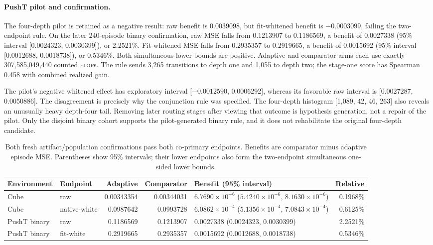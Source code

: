 \documentclass{article}
\newcommand{\flops}{\textsc{flop}s}
\begin{document}
\paragraph{PushT pilot and confirmation.}
The four-depth pilot is retained as a negative result: raw benefit is 0.0039098, but fit-whitened benefit is \(-0.0003099\), failing the two-endpoint rule. On the later 240-episode binary confirmation, raw MSE falls from 0.1213907 to 0.1186569, a benefit of 0.0027338 (95\% interval [0.0024323, 0.0030399]), or 2.2521\%. Fit-whitened MSE falls from 0.2935357 to 0.2919665, a benefit of 0.0015692 (95\% interval [0.0012688, 0.0018738]), or 0.5346\%. Both simultaneous lower bounds are positive. Adaptive and comparator arms each use exactly 307,585,049,440 counted \flops{}. The rule sends 3,265 transitions to depth one and 1,055 to depth two; the stage-one score has Spearman 0.458 with combined realized gain.

The pilot's negative whitened effect has exploratory interval [\(-0.0012590\), 0.0006292], whereas its favorable raw interval is [0.0027287, 0.0050886]. The disagreement is precisely why the conjunction rule was specified. The four-depth histogram [1,089, 42, 46, 263] also reveals an unusually heavy depth-four tail. Removing later routing stages after viewing that outcome is hypothesis generation, not a repair of the pilot. Only the disjoint binary cohort supports the pilot-generated binary rule, and it does not rehabilitate the original four-depth candidate.

\begin{table}[t]
\centering
\caption{Both fresh artifact/population confirmations pass both co-primary endpoints. Benefits are comparator minus adaptive episode MSE. Parentheses show 95\% intervals; their lower endpoints also form the two-endpoint simultaneous one-sided lower bounds.}
\label{tab:confirmations}
\scriptsize
\begin{tabularx}{\textwidth}{@{}l l r r Y r@{}}
\toprule
Environment & Endpoint & Adaptive & Comparator & Benefit (95\% interval) & Relative \\
\midrule
Cube & raw & 0.00343354 & 0.00344031 & \(6.7690{\times}10^{-6}\) (\(5.4240{\times}10^{-6}\), \(8.1630{\times}10^{-6}\)) & 0.1968\% \\
Cube & native-white & 0.0987642 & 0.0993728 & \(6.0862{\times}10^{-4}\) (\(5.1356{\times}10^{-4}\), \(7.0843{\times}10^{-4}\)) & 0.6125\% \\
PushT binary & raw & 0.1186569 & 0.1213907 & 0.0027338 (0.0024323, 0.0030399) & 2.2521\% \\
PushT binary & fit-white & 0.2919665 & 0.2935357 & 0.0015692 (0.0012688, 0.0018738) & 0.5346\% \\
\bottomrule
\end{tabularx}
\end{table}
\end{document}
